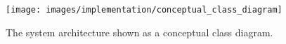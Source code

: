 
\begin{figure}[H]
	\centering
    \texttt{[image: images/implementation/conceptual\_class\_diagram]}
    \caption[Conceptual class diagram]{The system architecture shown as a conceptual class diagram.}
    \label{fig:conceptual_class_diagram}
\end{figure}
